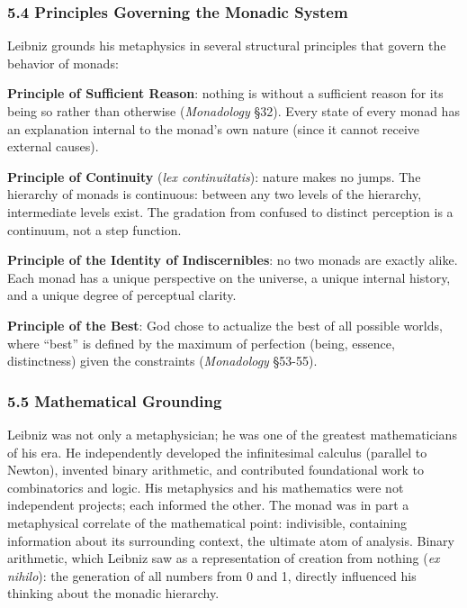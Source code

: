 \documentclass[
  11pt,
  letterpaper,
]{article}
\begin{document}
\subsubsection{5.4 Principles Governing the Monadic
System}\label{principles-governing-the-monadic-system}

Leibniz grounds his metaphysics in several structural principles that
govern the behavior of monads:

\textbf{Principle of Sufficient Reason}: nothing is without a sufficient
reason for its being so rather than otherwise (\emph{Monadology} §32).
Every state of every monad has an explanation internal to the monad's
own nature (since it cannot receive external causes).

\textbf{Principle of Continuity} (\emph{lex continuitatis}): nature
makes no jumps. The hierarchy of monads is continuous: between any two
levels of the hierarchy, intermediate levels exist. The gradation from
confused to distinct perception is a continuum, not a step function.

\textbf{Principle of the Identity of Indiscernibles}: no two monads are
exactly alike. Each monad has a unique perspective on the universe, a
unique internal history, and a unique degree of perceptual clarity.

\textbf{Principle of the Best}: God chose to actualize the best of all
possible worlds, where ``best'' is defined by the maximum of perfection
(being, essence, distinctness) given the constraints (\emph{Monadology}
§53-55).

\subsubsection{5.5 Mathematical Grounding}\label{mathematical-grounding}

Leibniz was not only a metaphysician; he was one of the greatest
mathematicians of his era. He independently developed the infinitesimal
calculus (parallel to Newton), invented binary arithmetic, and
contributed foundational work to combinatorics and logic. His
metaphysics and his mathematics were not independent projects; each
informed the other. The monad was in part a metaphysical correlate of
the mathematical point: indivisible, containing information about its
surrounding context, the ultimate atom of analysis. Binary arithmetic,
which Leibniz saw as a representation of creation from nothing (\emph{ex
nihilo}): the generation of all numbers from 0 and 1, directly
influenced his thinking about the monadic hierarchy.
\end{document}
